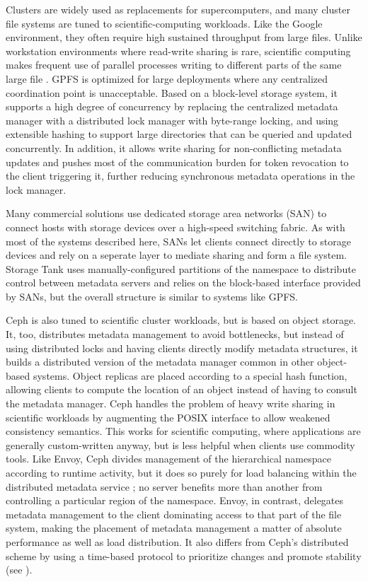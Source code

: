 Clusters are widely used as replacements for supercomputers, and many cluster file systems are tuned to scientific-computing workloads. Like the Google environment, they often require high sustained throughput from large files. Unlike workstation environments where read-write sharing is rare, scientific computing makes frequent use of parallel processes writing to different parts of the same large file \cite{wang04}. GPFS \cite{schmuck} is optimized for large deployments where any centralized coordination point is unacceptable. Based on a block-level storage system, it supports a high degree of concurrency by replacing the centralized metadata manager with a distributed lock manager with byte-range locking, and using extensible hashing to support large directories that can be queried and updated concurrently. In addition, it allows write sharing for non-conflicting metadata updates and pushes most of the communication burden for token revocation to the client triggering it, further reducing synchronous metadata operations in the lock manager.

Many commercial solutions use dedicated storage area networks (SAN) to connect hosts with storage devices over a high-speed switching fabric. As with most of the systems described here, SANs let clients connect directly to storage devices and rely on a seperate layer to mediate sharing and form a file system. Storage Tank \cite{menon} uses manually-configured partitions of the namespace to distribute control between metadata servers and relies on the block-based interface provided by SANs, but the overall structure is similar to systems like GPFS.

Ceph \cite{weil06} is also tuned to scientific cluster workloads, but is based on object storage. It, too, distributes metadata management to avoid bottlenecks, but instead of using distributed locks and having clients directly modify metadata structures, it builds a distributed version of the metadata manager common in other object-based systems. Object replicas are placed according to a special hash function, allowing clients to compute the location of an object instead of having to consult the metadata manager. Ceph handles the problem of heavy write sharing in scientific workloads by augmenting the POSIX interface to allow weakened consistency semantics. This works for scientific computing, where applications are generally custom-written anyway, but is less helpful when clients use commodity tools. Like Envoy, Ceph divides management of the hierarchical namespace according to runtime activity, but it does so purely for load balancing within the distributed metadata service \cite{weil04}; no server benefits more than another from controlling a particular region of the namespace. Envoy, in contrast, delegates metadata management to the client dominating access to that part of the file system, making the placement of metadata management a matter of absolute performance as well as load distribution. It also differs from Ceph's distributed scheme by using a time-based protocol to prioritize changes and promote stability (see ).

